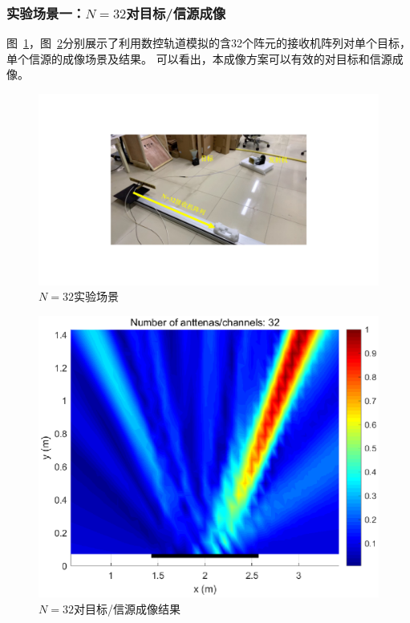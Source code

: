 \subsubsection{实验场景一：$N=32$对目标/信源成像}
图~\ref{32实验场景}，图~\ref{32结果}分别展示了利用数控轨道模拟的含32个阵元的接收机阵列对单个目标，单个信源的成像场景及结果。
可以看出，本成像方案可以有效的对目标和信源成像。
\begin{figure}[H]
  \centering
  \includegraphics[width=.8\textwidth]{figures/exp/32.pdf}
  \caption{$N=32$实验场景}
  \label{32实验场景}
\end{figure}
\begin{figure}[H]
  \centering
  \includegraphics[width=.8\textwidth]{figures/exp/N32.eps}
  \caption{$N=32$对目标/信源成像结果}
  \label{32结果}
\end{figure}
